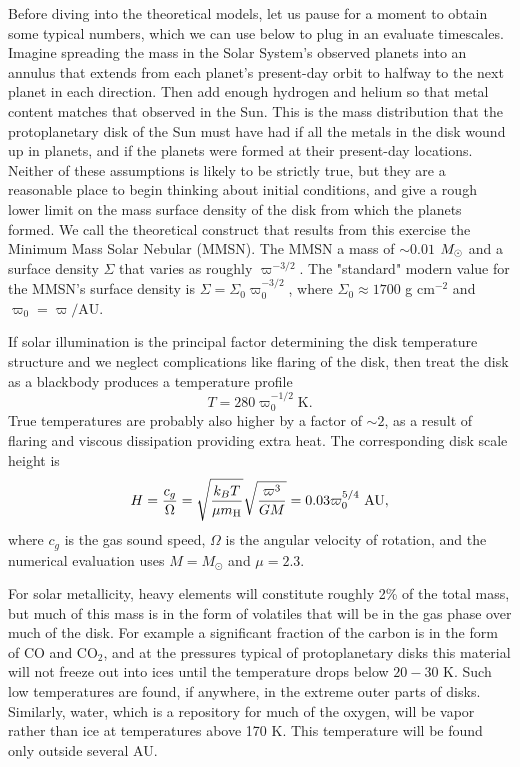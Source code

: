 Before diving into the theoretical models, let us pause for a moment to obtain some typical numbers, which we can use below to plug in an evaluate timescales. Imagine spreading the mass in the Solar System's observed planets into an annulus that extends from each planet's present-day orbit to halfway to the next planet in each direction. Then add enough hydrogen and helium so that metal content matches that observed in the Sun. This is the mass distribution that the protoplanetary disk of the Sun must have had if all the metals in the disk wound up in planets, and if the planets were formed at their present-day locations. Neither of these assumptions is likely to be strictly true, but they are a reasonable place to begin thinking about initial conditions, and give a rough lower limit on the mass surface density of the disk from which the planets formed. We call the theoretical construct that results from this exercise the Minimum Mass Solar Nebular (MMSN). The MMSN a mass of $\sim 0.01$ $M_{\odot}$ and a surface density $\Sigma$ that varies as roughly $\varpi^{-3/2}$. The "standard" modern value for the MMSN's surface density is $\Sigma=\Sigma_0 \varpi_0^{-3/2}$, where $\Sigma_0 \approx 1700$ g cm$^{-2}$ and $\varpi_0=\varpi/\mbox{AU}$.

If solar illumination is the principal factor determining the disk temperature structure and we neglect complications like flaring of the disk, then treat the disk as a blackbody produces a temperature profile
\begin{equation}
\label{eq:TMMSN}
T=280 \varpi_0^{-1/2}\mathrm{ K}.
\end{equation}
True temperatures are probably also higher by a factor of $\sim 2$, as a result of flaring and viscous dissipation providing extra heat. The corresponding disk scale height is
\begin{equation}
H = \frac{c_g}{\Omega} = \sqrt{\frac{k_B T}{\mu m_{\rm H}}} \sqrt{\frac{\varpi^3}{GM}} = 0.03 \varpi_0^{5/4}\mbox{ AU},
\end{equation}
where $c_g$ is the gas sound speed, $\Omega$ is the angular velocity of rotation, and the numerical evaluation uses $M = M_\odot$ and $\mu=2.3$.

For solar metallicity, heavy elements will constitute roughly 2\% of the total mass, but much of this mass is in the form of volatiles that will be in the gas phase over much of the disk. For example a significant fraction of the carbon is in the form of CO and CO$_2$, and at the pressures typical of protoplanetary disks this material will not freeze out into ices until the temperature drops below $20-30$ K. Such low temperatures are found, if anywhere, in the extreme outer parts of disks. Similarly, water, which is a repository for much of the oxygen, will be vapor rather than ice at temperatures above 170 K. This temperature will be found only outside several AU.

